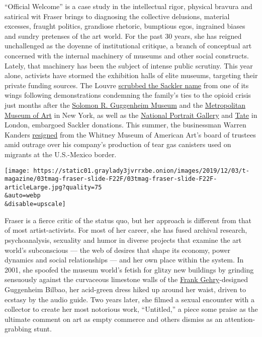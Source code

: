 ``Official Welcome'' is a case study in the intellectual rigor, physical
bravura and satirical wit Fraser brings to diagnosing the collective
delusions, material excesses, fraught politics, grandiose rhetoric,
bumptious egos, ingrained biases and sundry pretenses of the art world.
For the past 30 years, she has reigned unchallenged as the doyenne of
institutional critique, a branch of conceptual art concerned with the
internal machinery of museums and other social constructs. Lately, that
machinery has been the subject of intense public scrutiny. This year
alone, activists have stormed the exhibition halls of elite museums,
targeting their private funding sources. The Louvre
\href{https://www.nytimes3xbfgragh.onion/2019/07/17/arts/design/sackler-family-louvre.html}{scrubbed
the Sackler name} from one of its wings following demonstrations
condemning the family's ties to the opioid crisis just months after the
\href{https://www.nytimes3xbfgragh.onion/2019/03/22/arts/guggenheim-sackler-family-donations.html}{Solomon
R. Guggenheim Museum} and the
\href{https://www.nytimes3xbfgragh.onion/2019/05/15/arts/design/met-museum-sackler-opioids.html}{Metropolitan
Museum of Art} in New York, as well as the
\href{https://www.nytimes3xbfgragh.onion/2019/03/19/arts/design/national-portrait-gallery-sackler-donation-goldin.html}{National
Portrait Gallery} and
\href{https://www.nytimes3xbfgragh.onion/2019/03/21/arts/design/tate-modern-sackler-britain-opioid-art.html}{Tate}
in London, embargoed Sackler donations. This summer, the businessman
Warren Kanders
\href{https://www.nytimes3xbfgragh.onion/2019/07/25/arts/whitney-warren-kanders-resigns.html}{resigned}
from the Whitney Museum of American Art's board of trustees amid outrage
over his company's production of tear gas canisters used on migrants at
the U.S.-Mexico border.

\texttt{[image: https://static01.graylady3jvrrxbe.onion/images/2019/12/03/t-magazine/03tmag-fraser-slide-F22F/03tmag-fraser-slide-F22F-articleLarge.jpg?quality=75\\\&auto=webp\\\&disable=upscale]}

Fraser is a fierce critic of the status quo, but her approach is
different from that of most artist-activists. For most of her career,
she has fused archival research, psychoanalysis, sexuality and humor in
diverse projects that examine the art world's subconscious --- the web
of desires that shape its economy, power dynamics and social
relationships --- and her own place within the system. In 2001, she
spoofed the museum world's fetish for glitzy new buildings by grinding
sensuously against the curvaceous limestone walls of the
\href{https://www.nytimes3xbfgragh.onion/topic/person/frank-gehry}{Frank
Gehry}-designed Guggenheim Bilbao, her acid-green dress hiked up around
her waist, driven to ecstasy by the audio guide. Two years later, she
filmed a sexual encounter with a collector to create her most notorious
work, ``Untitled,'' a piece some praise as the ultimate comment on art
as empty commerce and others dismiss as an attention-grabbing stunt.

